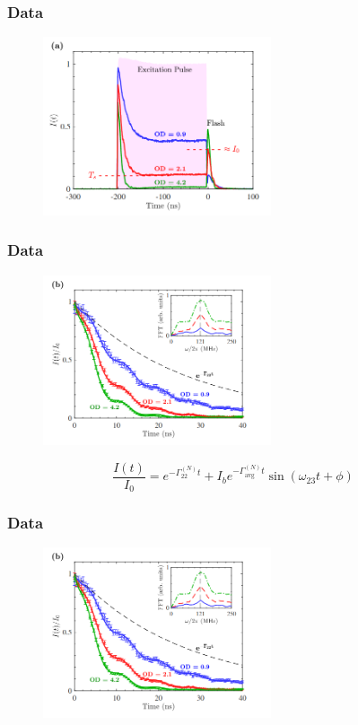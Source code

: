 \documentclass{beamer}
\theoremstyle{definition}
\newcommand{\f}[2]{\frac{#1}{#2}}
\begin{document}
\begin{frame}
	\frametitle{Data}
	
	\begin{figure}[!htb]
		\centering
		\includegraphics[width=0.6\textwidth]{data_full.png}
	\end{figure}
\end{frame}



\begin{frame}
	\frametitle{Data}
	
	\begin{figure}[!htb]
		\centering
		\includegraphics[width=0.6\textwidth]{data_zoom.png}
	\end{figure}

\begin{equation*}
\f{I(t)}{I_0} = e^{-\Gamma_{22}^{(N)}t} + I_b e^{-\Gamma_{\text{avg}}^{(N)}t} \sin(\omega_{23}t + \phi)
\end{equation*}
\end{frame}


\begin{frame}
	\frametitle{Data}
	
	\begin{figure}[!htb]
		\centering
		\includegraphics[width=0.6\textwidth]{data_zoom.png}
	\end{figure}
\end{frame}
\end{document}
